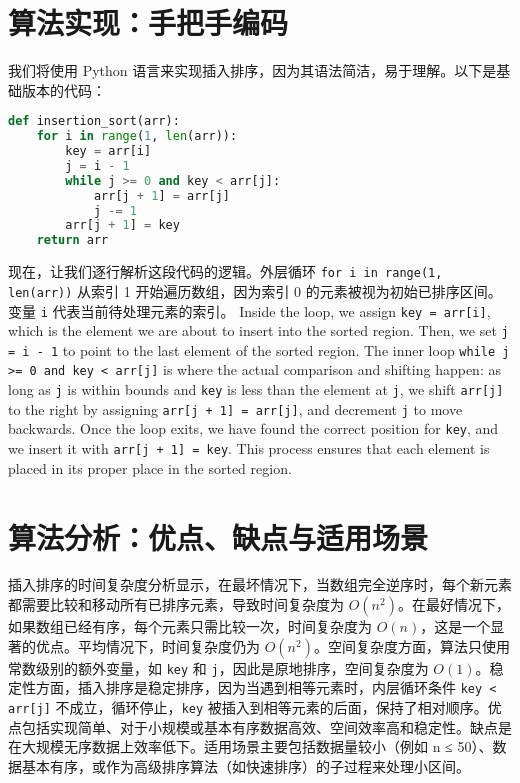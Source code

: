 \chapter{算法实现：手把手编码}
我们将使用 Python 语言来实现插入排序，因为其语法简洁，易于理解。以下是基础版本的代码：\par
\begin{lstlisting}[language=python]
def insertion_sort(arr):
    for i in range(1, len(arr)):
        key = arr[i]
        j = i - 1
        while j >= 0 and key < arr[j]:
            arr[j + 1] = arr[j]
            j -= 1
        arr[j + 1] = key
    return arr
\end{lstlisting}
现在，让我们逐行解析这段代码的逻辑。外层循环 \texttt{for i in range(1, len(arr))} 从索引 1 开始遍历数组，因为索引 0 的元素被视为初始已排序区间。变量 \texttt{i} 代表当前待处理元素的索引。 Inside the loop, we assign \texttt{key = arr[i]}, which is the element we are about to insert into the sorted region. Then, we set \texttt{j = i - 1} to point to the last element of the sorted region. The inner loop \texttt{while j >= 0 and key < arr[j]} is where the actual comparison and shifting happen: as long as \texttt{j} is within bounds and \texttt{key} is less than the element at \texttt{j}, we shift \texttt{arr[j]} to the right by assigning \texttt{arr[j + 1] = arr[j]}, and decrement \texttt{j} to move backwards. Once the loop exits, we have found the correct position for \texttt{key}, and we insert it with \texttt{arr[j + 1] = key}. This process ensures that each element is placed in its proper place in the sorted region.\par
\chapter{算法分析：优点、缺点与适用场景}
插入排序的时间复杂度分析显示，在最坏情况下，当数组完全逆序时，每个新元素都需要比较和移动所有已排序元素，导致时间复杂度为 $O(n^2)$。在最好情况下，如果数组已经有序，每个元素只需比较一次，时间复杂度为 $O(n)$，这是一个显著的优点。平均情况下，时间复杂度仍为 $O(n^2)$。空间复杂度方面，算法只使用常数级别的额外变量，如 \texttt{key} 和 \texttt{j}，因此是原地排序，空间复杂度为 $O(1)$。稳定性方面，插入排序是稳定排序，因为当遇到相等元素时，内层循环条件 \texttt{key < arr[j]} 不成立，循环停止，\texttt{key} 被插入到相等元素的后面，保持了相对顺序。优点包括实现简单、对于小规模或基本有序数据高效、空间效率高和稳定性。缺点是在大规模无序数据上效率低下。适用场景主要包括数据量较小（例如 n ≤ 50）、数据基本有序，或作为高级排序算法（如快速排序）的子过程来处理小区间。\par
